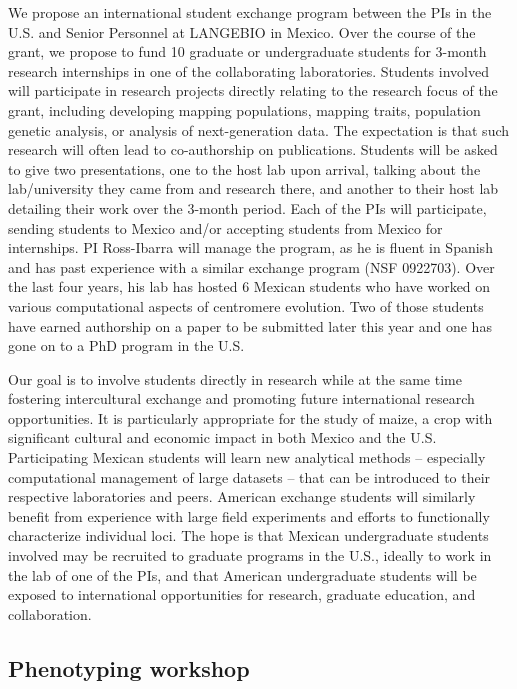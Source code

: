 We propose an international student exchange program between the PIs in the U.S. and Senior Personnel at LANGEBIO in Mexico. Over the course of the grant, we propose to fund 10 graduate or undergraduate students for 3-month research internships in one of the collaborating laboratories. Students involved will participate in research projects directly relating to the research focus of the grant, including developing mapping populations, mapping traits, population genetic analysis, or analysis of next-generation data. The expectation is that such research will often lead to co-authorship on publications. Students will be asked to give two presentations, one to the host lab upon arrival, talking about the lab/university they came from and research there, and another to their host lab detailing their work over the 3-month period.  Each of the PIs will participate, sending students to Mexico and/or accepting students from Mexico for internships. PI Ross-Ibarra will manage the program, as he is fluent in Spanish and has past experience with a similar exchange program (NSF 0922703). Over the last four years, his lab has hosted 6 Mexican students who have worked on various computational aspects of centromere evolution. Two of those students have earned authorship on a paper to be submitted later this year and one has gone on to a PhD program in the U.S.

Our goal is to involve students directly in research while at the same time fostering intercultural exchange and promoting future international research opportunities. It is particularly appropriate for the study of maize, a crop with significant cultural and economic impact in both Mexico and the U.S. Participating Mexican students will learn new analytical methods -- especially computational management of large datasets -- that can be introduced to their respective laboratories and peers. American exchange students will similarly benefit from experience with large field experiments and efforts to functionally characterize individual loci.  The hope is that Mexican undergraduate students involved may be recruited to graduate programs in the U.S., ideally to work in the lab of one of the PIs, and that American undergraduate students will be exposed to international opportunities for research, graduate education, and collaboration.

\subsection*{Phenotyping workshop} %

